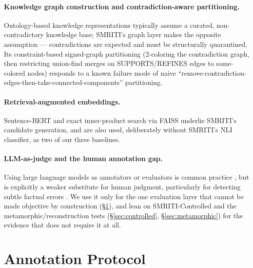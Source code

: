 \documentclass[11pt]{article}
\begin{document}
\paragraph{Knowledge graph construction and contradiction-aware
partitioning.} Ontology-based knowledge representations
\citep{mcguinness2004owl} typically assume a curated, non-contradictory
knowledge base; SMRITI's graph layer makes the opposite assumption ---
contradictions are expected and must be structurally quarantined. Its
constraint-based signed-graph partitioning (2-coloring the contradiction
graph, then restricting union-find merges on SUPPORTS/REFINES edges to
same-colored nodes) responds to a known failure mode of naive
``remove-contradiction-edges-then-take-connected-components'' partitioning.

\paragraph{Retrieval-augmented embeddings.} Sentence-BERT
\citep{reimers-gurevych-2019-sentence} and exact inner-product search via
FAISS \citep{johnson2019billion} underlie SMRITI's candidate generation,
and are also used, deliberately without SMRITI's NLI classifier, as two of
our three baselines.

\paragraph{LLM-as-judge and the human annotation gap.} Using large language
models as annotators or evaluators is common practice
\citep{zheng2023judging}, but is explicitly a weaker substitute for human
judgment, particularly for detecting subtle factual errors
\citep{ji2023survey}. We use it only for the one evaluation layer that
cannot be made objective by construction (\S\ref{sec:annotation}), and lean
on SMRITI-Controlled and the metamorphic/reconstruction tests
(\S\ref{sec:controlled}, \S\ref{sec:metamorphic}) for the evidence that
does not require it at all.





\section{Annotation Protocol}
\label{sec:annotation}



\end{document}
